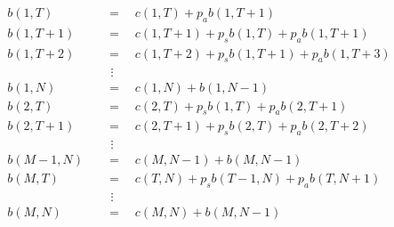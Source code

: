 \begin{align}
    b(1,T) \quad &= \quad c(1, T) + p_a b(1, T + 1) \label{eq:first_eq_of_blocking_general}\\
    b(1,T + 1) \quad &= \quad c(1, T + 1) + p_s b(1, T) + p_a b(1, T + 1) \\
    b(1,T + 2) \quad &= \quad c(1, T + 2) + p_s b(1, T + 1) + p_a b(1, T + 3) \\
    & \ \, \vdots \nonumber \\
    b(1, N) \quad &= \quad c(1, N) + b(1, N - 1) \\
    b(2, T) \quad &= \quad c(2, T) + p_s b(1, T) + p_a b(2, T + 1) \\
    b(2, T + 1) \quad &= \quad c(2, T + 1) + p_s b(2, T) + p_a b(2, T + 2) \\
    & \ \, \vdots \nonumber \\
    b(M - 1, N) \quad &= \quad c(M, N - 1) + b(M, N-1) \\ 
    b(M, T) \quad &= \quad c(T, N) + p_s b(T-1, N) + p_a b(T, N+1) \\
    & \ \, \vdots \nonumber \\
    b(M, N) \quad &= \quad c(M, N) + b(M, N-1) \label{eq:last_eq_of_blocking_general}
\end{align}

